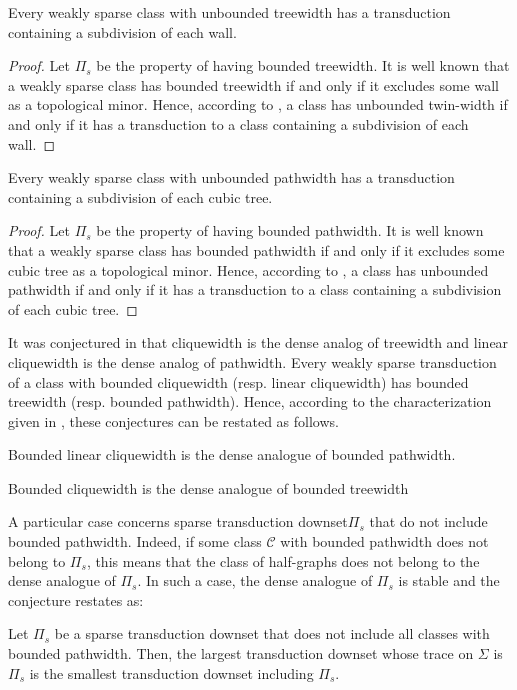 \documentclass{lmcs}
\newcommand{\Cc}{\mathscr{C}}
\theoremstyle{definition}
\newcommand{\dset}{downset\xspace}
\begin{document}
\begin{exa}
	\label{exa:tw}
	Every weakly  sparse class with unbounded treewidth has a transduction   containing a subdivision of each wall.
\end{exa}
\begin{proof}
	Let $\Pi_s$ be the property of having bounded treewidth.
	It is well known that a weakly sparse class has bounded treewidth if and only if it excludes some wall as a topological minor.
	Hence, according to , a class has unbounded twin-width if and only if it has a transduction to a class  containing a subdivision of each wall.
\end{proof}

\begin{exa}
	\label{exa:pw}
		Every weakly  sparse class with unbounded pathwidth has a transduction   containing a subdivision of each cubic tree.
\end{exa}
\begin{proof}
	Let $\Pi_s$ be the property of having bounded pathwidth.
	It is well known that a weakly sparse class has bounded pathwidth if and only if it excludes some cubic tree as a topological minor.
	Hence, according to , a class has unbounded pathwidth if and only if  it has a transduction to a class  containing a subdivision of each cubic tree.
\end{proof}

It was conjectured in \cite{gajarsky2022stable} that cliquewidth is the dense analog of treewidth and linear cliquewidth is the dense analog of pathwidth. Every weakly sparse transduction of a class with bounded cliquewidth (resp. linear cliquewidth) has bounded treewidth (resp. bounded pathwidth). Hence, according to the characterization given in , these conjectures can be restated as follows.

\begin{conj}
	\label{conj:lcw}
	Bounded linear cliquewidth is the dense analogue of bounded pathwidth.
\end{conj}
\begin{conj}
	\label{conj:cw}
	Bounded cliquewidth is the dense analogue of bounded treewidth
\end{conj}


A particular case concerns sparse transduction \dset $\Pi_s$ that do not include bounded pathwidth. Indeed, if some class $\Cc$ with bounded pathwidth does not belong to $\Pi_s$, this means that the class of half-graphs does not belong to the dense analogue of $\Pi_s$. In such a case, the dense analogue of $\Pi_s$ is stable and the conjecture restates as:
\begin{conj}
	Let $\Pi_s$ be a  sparse transduction \dset that does not include all classes with bounded pathwidth.
	Then, the  largest transduction \dset whose trace on $\Sigma$ is  $\Pi_s$ is the smallest transduction \dset including $\Pi_s$.
\end{conj}
\end{document}
